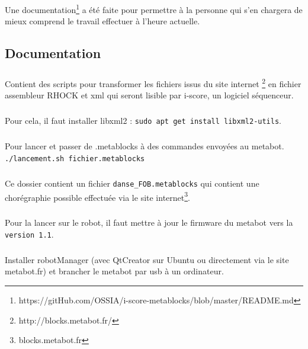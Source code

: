 \documentclass[10pt,a4paper]{report}
\begin{document}
Une documentation\footnote{https://gitHub.com/OSSIA/i-score-metablocks/blob/master/README.md} a été faite pour permettre à la personne qui s'en chargera de mieux comprend le travail effectuer à l'heure actuelle.


\def\appendixpage{\vspace*{8cm} 
\begin{center} 
\Huge\textbf{Annexes} 
\end{center} 
} 
\def\appendixname{Annexe}%

\begin{appendices} 
\chapter{Documentation} 
\paragraph{}
Contient des scripts pour transformer les fichiers issus du site internet \footnote{http://blocks.metabot.fr/} en fichier assembleur RHOCK et xml qui seront lisible par i-score, un logiciel séquenceur.
\paragraph{}
Pour cela, il faut installer libxml2 : 
\texttt{sudo apt get install libxml2-utils}.
\paragraph{}
Pour lancer et passer de .metablocks à des commandes envoyées au metabot.
\texttt{./lancement.sh fichier.metablocks}
\paragraph{}
Ce dossier contient un fichier \texttt{danse\_FOB.metablocks} qui contient une chorégraphie possible effectuée via le site internet\footnote{blocks.metabot.fr}.
\paragraph{}
Pour la lancer sur le robot, il faut mettre à jour le firmware du metabot vers la \texttt{version 1.1}.
\paragraph{}
Installer robotManager (avec QtCreator sur Ubuntu ou directement via le site metabot.fr) et brancher le metabot par usb à un ordinateur.

\end{appendices}
\end{document}
